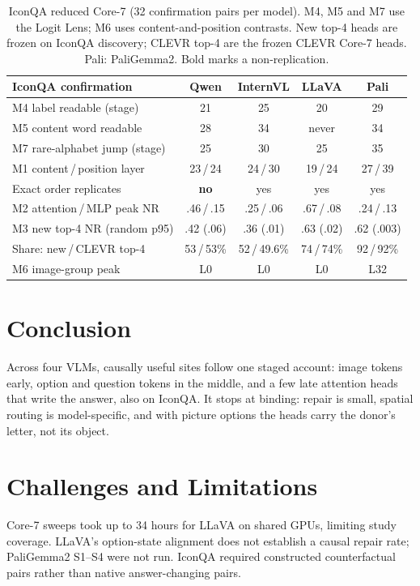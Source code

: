 \documentclass[11pt]{article}
\newcommand{\nr}{\mathrm{NR}}
\begin{document}
\begin{table}[t]
\centering
\scriptsize
\setlength{\tabcolsep}{3pt}
\begin{tabularx}{\columnwidth}{@{}>{\raggedright\arraybackslash}X cccc@{}}
\toprule
IconQA confirmation & Qwen & InternVL & LLaVA & Pali \\
\midrule
M4 label readable (stage) & 21 & 25 & 20 & 29 \\
M5 content word readable & 28 & 34 & never & 34 \\
M7 rare-alphabet jump (stage) & 25 & 30 & 25 & 35 \\
M1 content\,/\,position layer & 23\,/\,24 & 24\,/\,30 & 19\,/\,24 & 27\,/\,39 \\
Exact order replicates & \textbf{no} & yes & yes & yes \\
M2 attention\,/\,MLP peak $\nr$ & .46\,/\,.15 & .25\,/\,.06 & .67\,/\,.08 & .24\,/\,.13 \\
M3 new top-4 $\nr$ (random p95) & .42 (.06) & .36 (.01) & .63 (.02) & .62 (.003) \\
Share: new\,/\,CLEVR top-4 & 53\,/\,53\% & 52\,/\,49.6\% & 74\,/\,74\% & 92\,/\,92\% \\
M6 image-group peak & L0 & L0 & L0 & L32 \\
\bottomrule
\end{tabularx}
\caption{IconQA reduced Core-7 (32 confirmation pairs per model). M4, M5 and M7 use the Logit Lens; M6 uses content-and-position contrasts. New top-4 heads are frozen on IconQA discovery; CLEVR top-4 are the frozen CLEVR Core-7 heads. Pali: PaliGemma2. Bold marks a non-replication.}
\label{tab:iconqa}
\end{table}



\FloatBarrier

\section{Conclusion}
\label{sec:conclusion}

Across four VLMs, causally useful sites follow one staged account: image tokens early, option and question tokens in the middle, and a few late attention heads that write the answer, also on IconQA. It stops at binding: repair is small, spatial routing is model-specific, and with picture options the heads carry the donor's letter, not its object.

\label{main-content-end}

\section*{Challenges and Limitations}
Core-7 sweeps took up to 34 hours for LLaVA on shared GPUs, limiting study coverage. LLaVA's option-state alignment does not establish a causal repair rate; PaliGemma2 S1--S4 were not run. IconQA required constructed counterfactual pairs rather than native answer-changing pairs.
\end{document}
